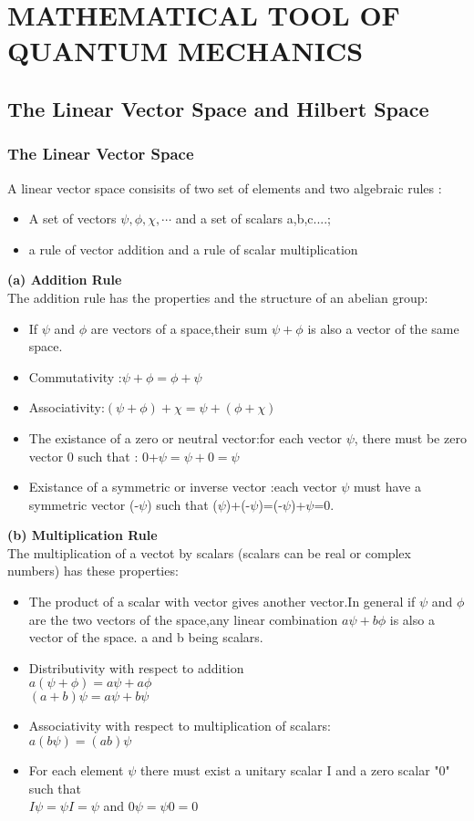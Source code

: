 \chapter{MATHEMATICAL TOOL OF QUANTUM MECHANICS}
\section{The Linear Vector Space and Hilbert Space}
\subsection{The Linear Vector Space}
A linear vector space consisits of two set of elements and two algebraic rules :
\begin{itemize}
	\item A set of vectors $\psi,\phi,\chi, \cdots $ and a set of scalars a,b,c....;
	\item a rule of vector addition and a rule of scalar multiplication
\end{itemize}
\textbf{(a) Addition Rule}\\
The addition rule has the properties and the structure of an abelian group:
\begin{itemize}
	\item If $\psi$ and $\phi$ are vectors of a space,their sum $\psi+\phi$ is also a vector of the same space.
	\item Commutativity :$\psi+\phi=\phi+\psi$
	\item Associativity:$(\psi+\phi)+\chi=\psi+(\phi+\chi)$
	\item The existance of a zero or neutral vector:for each vector $\psi$, there must be zero vector 0 such that : 0+$\psi=\psi+0=\psi$
	\item Existance of a symmetric or inverse vector :each vector $\psi$ must have a symmetric vector (-$\psi$) such that ($\psi$)+(-$\psi$)=(-$\psi$)+$\psi$=0.
\end{itemize}
\textbf{(b) Multiplication Rule}\\
The multiplication of a vectot by scalars (scalars can be real or complex numbers) has these properties:
\begin{itemize}
	\item The product of a scalar with vector gives another vector.In general if $\psi$ and $\phi$ are the two vectors of the space,any linear combination $a\psi+b\phi$ is also a vector of the space. a and b being scalars.
	\item Distributivity with respect to addition\\
	$a(\psi+\phi)=a\psi+a\phi$\\
	$(a+b)\psi=a\psi+b\psi$
	\item Associativity with respect to multiplication of scalars:\\
	$a(b\psi)=(ab)\psi$
	\item For each element $\psi$ there must exist a unitary scalar I and a zero scalar "0" such that \\
	$I\psi=\psi I =\psi$ and $0\psi=\psi0=0$
\end{itemize}

